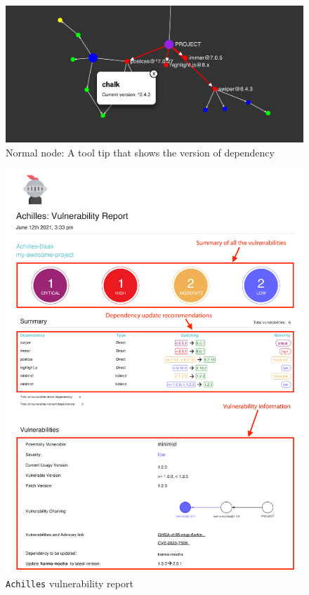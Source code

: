 \documentclass[conference]{IEEEtran}
\begin{document}
	\begin{figure}
		\centering
		\includegraphics[width=\linewidth]{Figures/tooltip_normal}
		\caption{Normal node: A tool tip that shows the version of dependency}
		\label{fig:tooltip_normal}
	\end{figure}
	
	
	\begin{figure}[tb]
		\centering
		\includegraphics[width=\columnwidth]{Figures/my-awesome-project-achilles-report-1.png}
		\caption{\texttt{Achilles} vulnerability report}
		\label{fig:vul-report-1}
	\end{figure}
	
\end{document}
